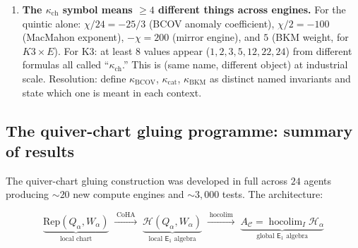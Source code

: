 \documentclass[11pt]{article}
\newcommand{\cC}{\mathcal{C}}
\newcommand{\cH}{\mathcal{H}}
\newcommand{\Eone}{\mathsf{E}_1}
\newcommand{\CoHA}{\mathrm{CoHA}}
\newcommand{\Rep}{\mathrm{Rep}}
\begin{document}
\begin{enumerate}[label=\textbf{F\arabic*.}]
 The identification BCOV $=$ shadow is TRUE at the structural/categorical level: the holomorphic
 anomaly equation IS the genus spectral sequence of an MC equation in the Costello--Li dgLa
 (Costello 2007, Costello--Li 2016). But the naive quantitative instantiation
 $F_g = \kappa_{\mathrm{ch}} \cdot \lambda_g^{\mathrm{FP}}$ is FALSE for compact CY$_3$ at $g \geq 2$. The
 shadow formula works for the \emph{uniform-weight lane} (where all generators have the same
 conformal weight), which covers free fields and toric CY$_3$ but NOT compact CY$_3$ with
 worldsheet instantons. The compact case requires the FULL shadow obstruction tower $\Theta_A$
 (not just the scalar projection $\kappa_{\mathrm{ch}}$), and the higher-degree shadows encode the instanton
 corrections.

\item \textbf{The $\kappa_{\mathrm{ch}}$ symbol means $\geq 4$ different things across engines.} For the
 quintic alone: $\chi/24 = -25/3$ (BCOV anomaly coefficient), $\chi/2 = -100$ (MacMahon exponent),
 $-\chi = 200$ (mirror engine), and $5$ (BKM weight, for $K3 \times E$). For K3: at least $8$
 values appear ($1, 2, 3, 5, 12, 22, 24$) from different formulas all called ``$\kappa_{\mathrm{ch}}$.'' This is (same name, different object) at industrial scale. Resolution: define $\kappa_{\mathrm{BCOV}}$,
 $\kappa_{\mathrm{cat}}$, $\kappa_{\mathrm{BKM}}$ as distinct named invariants and state which one
 is meant in each context.
\end{enumerate}

\subsection{The quiver-chart gluing programme: summary of results}
\label{subsec:qcg-summary}

The quiver-chart gluing construction was developed in full across $24$ agents producing
$\sim\!20$ new compute engines and $\sim\!3{,}000$ tests. The architecture:

\[
 \underbrace{\Rep(Q_\alpha, W_\alpha)}_{\text{local chart}}
 \;\xrightarrow{\;\CoHA\;}\;
 \underbrace{\cH(Q_\alpha, W_\alpha)}_{\text{local $\Eone$ algebra}}
 \;\xrightarrow{\;\mathrm{hocolim}\;}\;
 \underbrace{A_\cC = \operatorname{hocolim}_I \cH_\alpha}_{\text{global $\Eone$ algebra}}
\]
\end{document}

